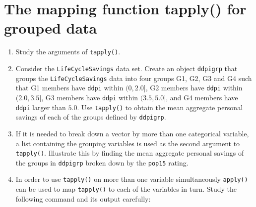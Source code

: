 \documentclass[
]{book}
\newenvironment{Shaded}{\begin{snugshade}}{\end{snugshade}}
\newcommand{\AttributeTok}[1]{\textcolor[rgb]{0.13,0.29,0.53}{#1}}
\newcommand{\CommentTok}[1]{\textcolor[rgb]{0.56,0.35,0.01}{\textit{#1}}}
\newcommand{\ControlFlowTok}[1]{\textcolor[rgb]{0.13,0.29,0.53}{\textbf{#1}}}
\newcommand{\DecValTok}[1]{\textcolor[rgb]{0.00,0.00,0.81}{#1}}
\newcommand{\FloatTok}[1]{\textcolor[rgb]{0.00,0.00,0.81}{#1}}
\newcommand{\FunctionTok}[1]{\textcolor[rgb]{0.13,0.29,0.53}{\textbf{#1}}}
\newcommand{\NormalTok}[1]{#1}
\newcommand{\OtherTok}[1]{\textcolor[rgb]{0.56,0.35,0.01}{#1}}
\newcommand{\SpecialCharTok}[1]{\textcolor[rgb]{0.81,0.36,0.00}{\textbf{#1}}}
\newcommand{\StringTok}[1]{\textcolor[rgb]{0.31,0.60,0.02}{#1}}
\begin{document}
\section{The mapping function tapply() for grouped data}\label{the-mapping-function-tapply-for-grouped-data}

\begin{enumerate}
\def\labelenumi{(\alph{enumi})}
\item
  Study the arguments of \texttt{tapply()}.
\item
  Consider the \texttt{LifeCycleSavings} data set. Create an object \texttt{ddpigrp} that groups the \texttt{LifeCycleSavings} data into four groups G1, G2, G3 and G4 such that G1 members have \texttt{ddpi} within \((0, 2.0]\), G2 members have \texttt{ddpi} within \((2.0, 3.5]\), G3 members have \texttt{ddpi} within \((3.5, 5.0]\), and G4 members have \texttt{ddpi} larger than \(5.0\). Use \texttt{tapply()} to obtain the mean aggregate personal savings of each of the groups defined by \texttt{ddpigrp}.
\item
  If it is needed to break down a vector by more than one categorical variable, a list containing the grouping variables is used as the second argument to \texttt{tapply()}. Illustrate this by finding the mean aggregate personal savings of the groups in \texttt{ddpigrp} broken down by the \texttt{pop15} rating.
\item
  In order to use \texttt{tapply()} on more than one variable simultaneously \texttt{apply()} can be used to map \texttt{tapply()} to each of the variables in turn. Study the following command and its output carefully:
\end{enumerate}

\begin{Shaded}
\end{Shaded}
\end{document}

